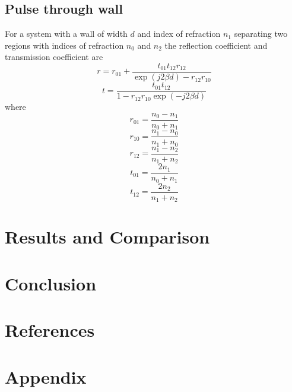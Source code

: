 \documentclass{article}
\begin{document}
\subsection{Pulse through wall}
For a system with a wall of width $d$ and index of refraction $n_1$ separating two regions with indices of refraction $n_0$ and $n_2$ the reflection coefficient and transmission coefficient are
\begin{equation}
r = r_{01} + \frac{t_{01}t_{12}r_{12}}{\exp(j2\beta d) - r_{12}r_{10}}
\end{equation}
\begin{equation}
t = \frac{t_{01} t_{12}}{1-r_{12}r_{10}\exp(-j2\beta d)}
\end{equation}
where 
\begin{equation}
r_{01} = \frac{n_0 - n_1}{n_0 + n_1}
\end{equation}
\begin{equation}
r_{10} = \frac{n_1 - n_0}{n_1 + n_0}
\end{equation}
\begin{equation}
r_{12} = \frac{n_1 - n_2}{n_1 + n_2}
\end{equation}
\begin{equation}
t_{01} = \frac{2n_1}{n_0 + n_1}
\end{equation}
\begin{equation}
t_{12} = \frac{2n_2}{n_1 + n_2}
\end{equation}

\section{Results and Comparison}

\section{Conclusion}

\section{References}

\section{Appendix}
\end{document}
